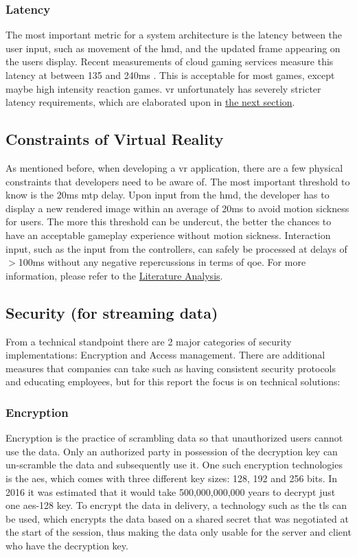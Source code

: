 \subsubsection{Latency}
The most important metric for a system architecture is the latency between the user input, such as movement of the \acrshort{hmd}, and the updated frame appearing on the users display. Recent measurements of cloud gaming services measure this latency at between 135 and 240\acrshort{ms} \parencite{lagmeasure}. This is acceptable for most games, except maybe high intensity reaction games. \acrshort{vr} unfortunately has severely stricter latency requirements, which are elaborated upon in \hyperref[ssec:vrphy]{the next section}.

\subsection{Constraints of Virtual Reality}
\label{ssec:vrphy}
As mentioned before, when developing a \acrshort{vr} application, there are a few physical constraints that developers need to be aware of. The most important threshold to know is the 20\acrshort{ms} \acrshort{mtp} delay. Upon input from the \acrshort{hmd}, the developer has to display a new rendered image within an average of 20\acrshort{ms} to avoid motion sickness for users. The more this threshold can be undercut, the better the chances to have an acceptable gameplay experience without motion sickness. Interaction input, such as the input from the controllers, can safely be processed at delays of $>$100\acrshort{ms} without any negative repercussions in terms of \acrfull{qoe}. For more information, please refer to the \hyperref[sec:lit]{Literature Analysis}.

\subsection{Security (for streaming data)}
From a technical standpoint there are 2 major categories of security implementations: Encryption and Access management. There are additional measures that companies can take such as having consistent security protocols and educating employees, but for this report the focus is on technical solutions:

\subsubsection{Encryption}
Encryption is the practice of scrambling data so that unauthorized users cannot use the data. Only an authorized party in possession of the decryption key can un-scramble the data and subsequently use it. 
One such encryption technologies is the \acrfull{aes}, which comes with three different key sizes: 128, 192 and 256 bits. In 2016 it was estimated that it would take 500,000,000,000 years to decrypt just one \acrshort{aes}-128 key.
To encrypt the data in delivery, a technology such as the \acrfull{tls} can be used, which encrypts the data based on a shared secret that was negotiated at the start of the session, thus making the data only usable for the server and client who have the decryption key.
